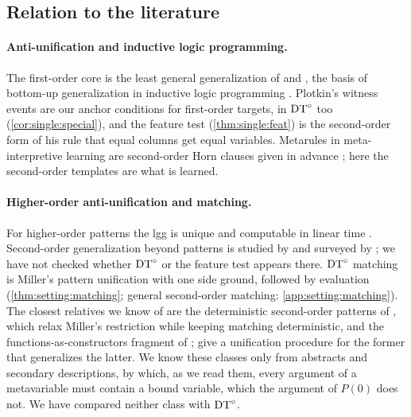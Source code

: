 \subsection{Relation to the literature}\label{sec:disc:lit}

\paragraph{Anti-unification and inductive logic programming.}
The first-order core is the least general generalization of \citet{plotkin1970note} and
\citet{reynolds1970transformational}, the basis of bottom-up generalization in inductive logic programming
\citep{muggleton1991inductive}. Plotkin's witness events are our anchor conditions for first-order targets, in $\mathrm{DT}^{\circ}$
too (\cref{cor:single:special}), and the feature test (\cref{thm:single:feat}) is the second-order form of his rule
that equal columns get equal variables. Metarules in meta-interpretive learning are second-order Horn clauses given in
advance \citep{muggleton2015meta,cropper2020logical}; here the second-order templates are what is learned.

\paragraph{Higher-order anti-unification and matching.}
For higher-order patterns the lgg is unique \citep{pfenning1991unification} and computable in linear time
\citep{baumgartner2017higher}. Second-order generalization beyond patterns is studied by
\citet{hirata2004generalization} and surveyed by \citet{cerna2023antiunification}; we have not checked whether $\mathrm{DT}^{\circ}$
or the feature test appears there. $\mathrm{DT}^{\circ}$ matching is Miller's pattern unification with one side ground, followed by
evaluation (\cref{thm:setting:matching}; general second-order matching: \cref{app:setting:matching}).
The closest relatives we know of are the deterministic second-order patterns of \citet{yokoyama2004deterministic},
which relax Miller's restriction while keeping matching deterministic, and the functions-as-constructors fragment of
\citet{libal2016functions}; \citet{niederhauser2026unification} give a unification procedure for the former that
generalizes the latter. We know these classes only from abstracts and secondary descriptions, by which, as we read them,
every argument of a metavariable must contain a bound variable, which the argument of $P(0)$ does not. We have compared neither class
with $\mathrm{DT}^{\circ}$.

